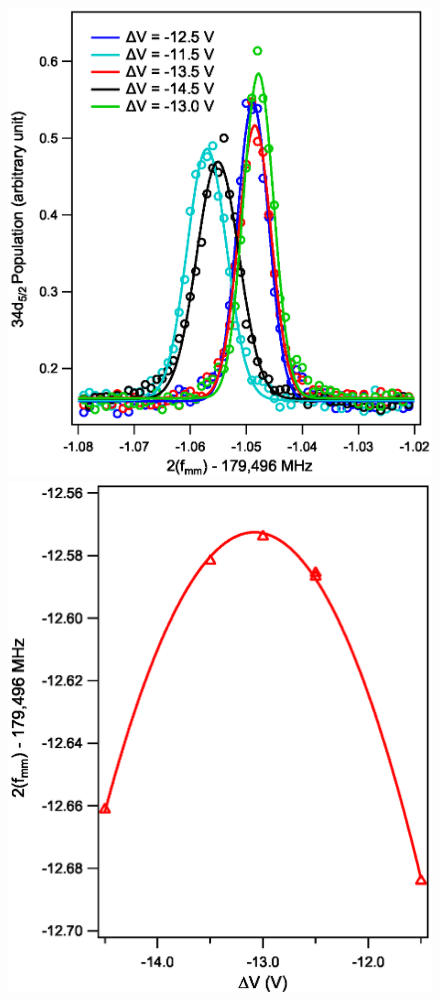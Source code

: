 \documentclass[landscape]{sciposter}
\begin{document}
\begin{multicols}{4}
\begin{figure}
\begin{center}
\includegraphics[scale = 0.8]{33d52_deltaV_population.eps}
\includegraphics[scale = 0.8]{33d52_DeltaV.eps}

\end{center}
\end{figure}
\end{multicols}
\end{document}

